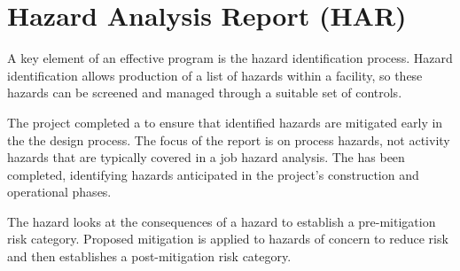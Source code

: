 \section{Hazard Analysis Report (HAR)}

A key element of an effective  program is the hazard
identification process. Hazard identification allows production of a
list of hazards within a facility, so these hazards can be screened
and managed through a suitable set of controls.

The  project completed a 
to ensure that identified hazards are mitigated early in the
the design process.  The focus of the report is on process hazards,
not activity hazards that are typically covered in a job hazard
analysis.  The  has been completed, identifying
hazards anticipated in the project's construction and operational
phases.

The hazard  looks at the consequences of a hazard
to establish a pre-mitigation risk category. Proposed mitigation is
applied to hazards of concern to reduce risk and then establishes a
post-mitigation risk category.

